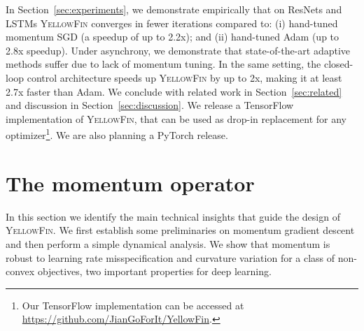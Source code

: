 \documentclass{article}
\newcommand{\tuner}{\textsc{YellowFin}\xspace}
\newcommand{\yell}[1]{#1}
\newcommand{\outline}[1]{}
\begin{document}
\outline{[empirical performance statement on \tuner]}
In Section~\ref{sec:experiments}, we demonstrate empirically that \yell{on ResNets and LSTMs}
\tuner  converges in fewer iterations compared to:
(i) hand-tuned momentum SGD (a speedup of up to 2.2x);
and (ii) hand-tuned Adam (up to 2.8x speedup).
Under asynchrony, we demonstrate that state-of-the-art adaptive methods suffer due to lack of momentum tuning.
In the same setting, the closed-loop control architecture speeds up \tuner by up to 2x, 
making it at least 2.7x faster than Adam.
We conclude with related work in Section~\ref{sec:related} and discussion in Section~\ref{sec:discussion}.
We release a TensorFlow implementation of \tuner, that can be used as drop-in replacement for any optimizer\footnote{Our TensorFlow implementation can be accessed at \url{https://github.com/JianGoForIt/YellowFin}.}.
We are also planning a PyTorch release.




\section{The momentum operator}
\label{sec:momentum_operator}

\newcommand{\gc}{generalized curvature\xspace}
\newcommand{\Gc}{Generalized curvature\xspace}

In this section we identify the main technical insights that guide the design of \tuner. 
We first establish some preliminaries on momentum gradient descent 
and then perform a simple dynamical analysis.
We show that momentum is robust to learning rate misspecification and curvature variation for a class of non-convex objectives, two important properties for deep learning.
\end{document}
